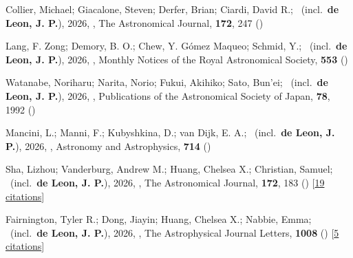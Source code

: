 \item[{\color{numcolor}\scriptsize104}] Collier, Michael; Giacalone, Steven; Derfer, Brian; Ciardi, David R.; \etal\ (incl.\ \textbf{de Leon, J. P.}), 2026, , The Astronomical Journal, \textbf{172}, 247 ()

\item[{\color{numcolor}\scriptsize103}] Lang, F. Zong; Demory, B. O.; Chew, Y. G{\'o}mez Maqueo; Schmid, Y.; \etal\ (incl.\ \textbf{de Leon, J. P.}), 2026, , Monthly Notices of the Royal Astronomical Society, \textbf{553} ()

\item[{\color{numcolor}\scriptsize102}] Watanabe, Noriharu; Narita, Norio; Fukui, Akihiko; Sato, Bun'ei; \etal\ (incl.\ \textbf{de Leon, J. P.}), 2026, , Publications of the Astronomical Society of Japan, \textbf{78}, 1992 ()

\item[{\color{numcolor}\scriptsize101}] Mancini, L.; Manni, F.; Kubyshkina, D.; van Dijk, E. A.; \etal\ (incl.\ \textbf{de Leon, J. P.}), 2026, , Astronomy and Astrophysics, \textbf{714} ()

\item[{\color{numcolor}\scriptsize100}] Sha, Lizhou; Vanderburg, Andrew M.; Huang, Chelsea X.; Christian, Samuel; \etal\ (incl.\ \textbf{de Leon, J. P.}), 2026, , The Astronomical Journal, \textbf{172}, 183 () [\href{https://ui.adsabs.harvard.edu/abs/2026AJ....172..183S}{19 citations}]

\item[{\color{numcolor}\scriptsize99}] Fairnington, Tyler R.; Dong, Jiayin; Huang, Chelsea X.; Nabbie, Emma; \etal\ (incl.\ \textbf{de Leon, J. P.}), 2026, , The Astrophysical Journal Letters, \textbf{1008} () [\href{https://ui.adsabs.harvard.edu/abs/2026ApJ..1008L...6F}{5 citations}]

